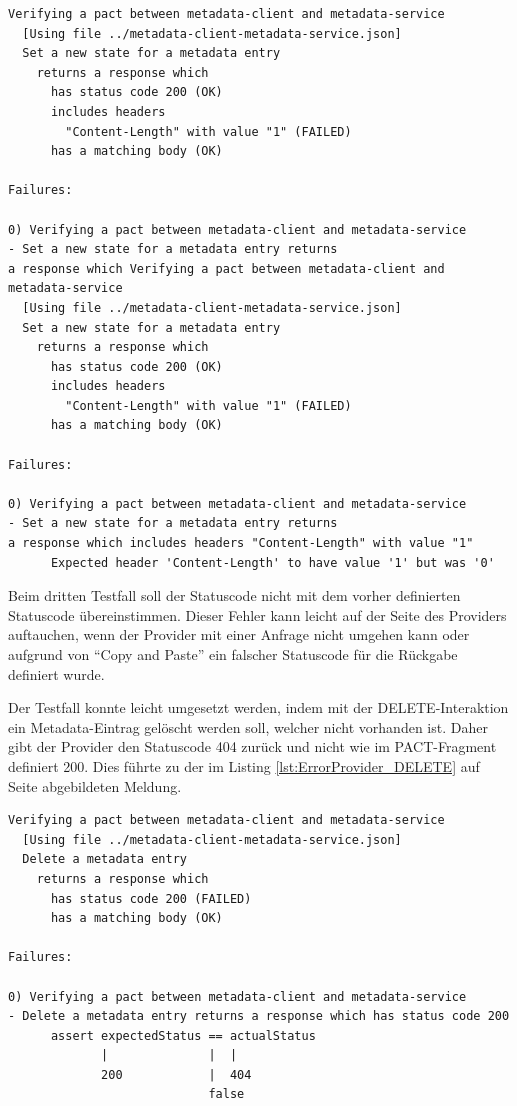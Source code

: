 \documentclass{llncs}
\begin{document}
\begin{lstlisting}[caption=Test,label={lst:ErrorProvider_PUT}]
Verifying a pact between metadata-client and metadata-service
  [Using file ../metadata-client-metadata-service.json]
  Set a new state for a metadata entry
    returns a response which
      has status code 200 (OK)
      includes headers
        "Content-Length" with value "1" (FAILED)
      has a matching body (OK)

Failures:

0) Verifying a pact between metadata-client and metadata-service 
- Set a new state for a metadata entry returns 
a response which Verifying a pact between metadata-client and metadata-service
  [Using file ../metadata-client-metadata-service.json]
  Set a new state for a metadata entry
    returns a response which
      has status code 200 (OK)
      includes headers
        "Content-Length" with value "1" (FAILED)
      has a matching body (OK)

Failures:

0) Verifying a pact between metadata-client and metadata-service 
- Set a new state for a metadata entry returns 
a response which includes headers "Content-Length" with value "1"
      Expected header 'Content-Length' to have value '1' but was '0'
\end{lstlisting}
      
Beim dritten Testfall soll der Statuscode nicht mit dem vorher definierten Statuscode übereinstimmen. Dieser Fehler kann leicht auf der Seite des Providers auftauchen, wenn der Provider mit einer Anfrage nicht umgehen kann oder aufgrund von \enquote{Copy and Paste} ein falscher Statuscode für die Rückgabe definiert wurde. 

Der Testfall konnte leicht umgesetzt werden, indem mit der DELETE-Interaktion ein Metadata-Eintrag gelöscht werden soll, welcher nicht vorhanden ist. Daher gibt der Provider den Statuscode 404 zurück und nicht wie im PACT-Fragment definiert 200. Dies führte zu der im Listing \ref{lst:ErrorProvider_DELETE} auf Seite \pageref{lst:ErrorProvider_DELETE} abgebildeten Meldung.  

\begin{lstlisting}[caption=Test,label={lst:ErrorProvider_DELETE}]
Verifying a pact between metadata-client and metadata-service
  [Using file ../metadata-client-metadata-service.json]
  Delete a metadata entry
    returns a response which
      has status code 200 (FAILED)
      has a matching body (OK)

Failures:

0) Verifying a pact between metadata-client and metadata-service 
- Delete a metadata entry returns a response which has status code 200
      assert expectedStatus == actualStatus
             |              |  |
             200            |  404
                            false
\end{lstlisting}
\end{document}
